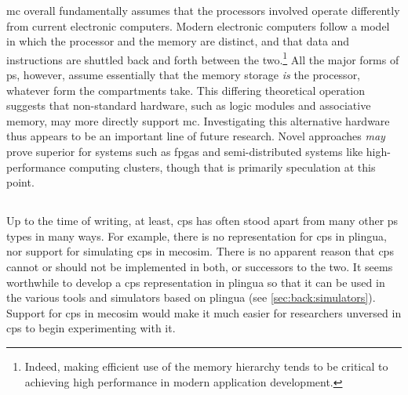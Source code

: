 \Gls{mc} overall fundamentally assumes that the processors involved operate differently from current electronic computers.  Modern electronic computers follow a model in which the processor and the memory are distinct, and that data and instructions are shuttled back and forth between the two.\footnote{Indeed, making efficient use of the memory hierarchy tends to be critical to achieving high performance in modern application development.}  All the major forms of \gls{ps}, however, assume essentially that the memory storage \emph{is} the processor, whatever form the \glspl{compartment} take.  This differing theoretical operation suggests that non-standard hardware, such as logic modules and associative memory, may more directly support \gls{mc}.  Investigating this alternative hardware thus appears to be an important line of future research.  Novel approaches \emph{may} prove superior for systems such as \glspl{fpga} and semi-distributed systems like high-performance computing clusters, though that is primarily speculation at this point.


\subsection{}
Up to the time of writing, at least, \gls{cps} has often stood apart from many other \gls{ps} types in many ways.  For example, there is no representation for \gls{cps} in \gls{plingua}, nor support for simulating \gls{cps} in \gls{mecosim}.  There is no apparent reason that \gls{cps} cannot or should not be implemented in both, or successors to the two.  It seems worthwhile to develop a \gls{cps} representation in \gls{plingua} so that it can be used in the various tools and simulators based on \gls{plingua} (see \vref{sec:back:simulators}).  Support for \gls{cps} in \gls{mecosim} would make it much easier for researchers unversed in \gls{cps} to begin experimenting with it.